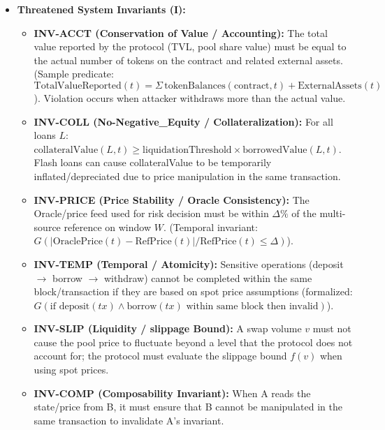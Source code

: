 \begin{itemize}
    \item \textbf{Threatened System Invariants (I):}
    \begin{itemize}
        \item \textbf{INV-ACCT (Conservation of Value / Accounting):} The total value reported by the protocol (TVL, pool share value) must be equal to the actual number of tokens on the contract and related external assets. (Sample predicate: $\mathrm{TotalValueReported}(t) = \Sigma\, \mathrm{tokenBalances}(\mathrm{contract}, t) + \mathrm{ExternalAssets}(t)$). Violation occurs when attacker withdraws more than the actual value.
        \item \textbf{INV-COLL (No-Negative\_Equity / Collateralization):} For all loans $L$: $\mathrm{collateralValue}(L,t) \geq \mathrm{liquidationThreshold} \times \mathrm{borrowedValue}(L,t)$. Flash loans can cause collateralValue to be temporarily inflated/depreciated due to price manipulation in the same transaction.
        \item \textbf{INV-PRICE (Price Stability / Oracle Consistency):} The Oracle/price feed used for risk decision must be within $\Delta\%$ of the multi-source reference on window $W$. (Temporal invariant: $G(|\mathrm{OraclePrice}(t) - \mathrm{RefPrice}(t)|/\mathrm{RefPrice}(t) \leq \Delta)$).
        \item \textbf{INV-TEMP (Temporal / Atomicity):} Sensitive operations (deposit $\rightarrow$ borrow $\rightarrow$ withdraw) cannot be completed within the same block/transaction if they are based on spot price assumptions (formalized: $G(\text{if deposit}(tx) \wedge \text{borrow}(tx) \text{ within same block then invalid})$).
        \item \textbf{INV-SLIP (Liquidity / slippage Bound):} A swap volume $v$ must not cause the pool price to fluctuate beyond a level that the protocol does not account for; the protocol must evaluate the slippage bound $f(v)$ when using spot prices.
        \item \textbf{INV-COMP (Composability Invariant):} When A reads the state/price from B, it must ensure that B cannot be manipulated in the same transaction to invalidate A's invariant. \cite{werner2022sok, eskandari2021sok}
    \end{itemize}


\end{itemize}

